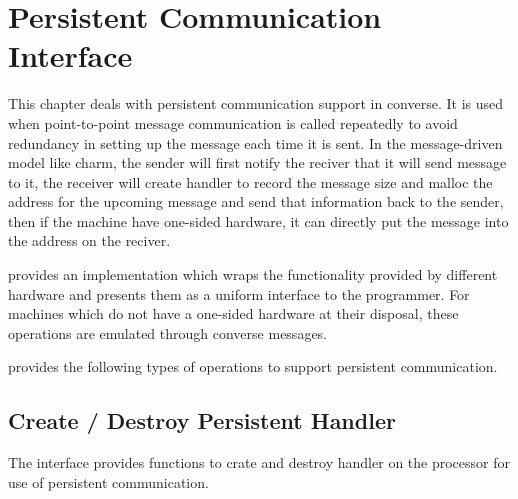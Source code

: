 
\chapter{\converse{} Persistent Communication Interface}

This chapter deals with persistent communication support in converse. It is used when point-to-point message communication is called repeatedly to avoid redundancy in setting up the message each time it is sent. In the message-driven model like charm, the sender will first notify the reciver that it will send message to it, the receiver will create handler to record the message size and malloc the address for the upcoming message and send that information back to the sender, then if the machine have one-sided hardware, it can directly put the message into the address on the reciver.

\converse{} provides an implementation which wraps the functionality provided
by different hardware and presents them as a uniform interface to the
programmer. For machines which do not have a one-sided hardware at their
disposal, these operations are emulated through converse messages.

\converse{} provides the following types of operations to support persistent
communication.


\section{Create / Destroy Persistent Handler}
The interface provides functions to crate and destroy handler on the processor for use of persistent communication.



